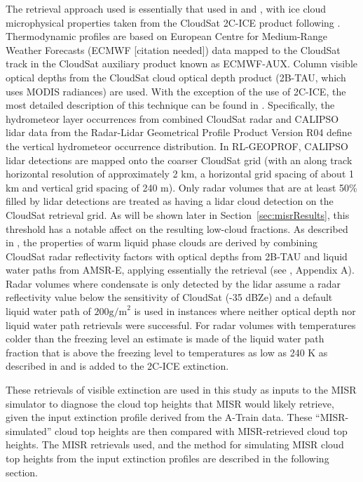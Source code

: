 The retrieval approach used is essentially that used in
\citet{mace_and_wrenn_2013} and \citet{berry_and_mace_2014}, with ice
cloud microphysical properties taken from the CloudSat 2C-ICE product
\citep{deng_et_al_2010, deng_et_al_2013} following
\citet{berry_and_mace_2014}. Thermodynamic profiles are based on
European Centre for Medium-Range Weather Forecasts (ECMWF {[}citation
needed{]}) data mapped to the CloudSat track in the CloudSat auxiliary
product known as ECMWF-AUX. Column visible optical depths from the
CloudSat cloud optical depth product (2B-TAU, which uses MODIS
radiances) are used. With the exception of the use of 2C-ICE, the most
detailed description of this technique can be found in
\citet{mace_2010}. Specifically, the hydrometeor layer occurrences from
combined CloudSat radar and CALIPSO lidar data from the Radar-Lidar
Geometrical Profile Product
\citep[RL-GEOPROF;][]{mace_et_al_2009, mace_and_zhang_2014} Version R04
define the vertical hydrometeor occurrence distribution. In RL-GEOPROF,
CALIPSO lidar detections are mapped onto the coarser CloudSat grid (with
an along track horizontal resolution of approximately 2 km, a horizontal
grid spacing of about 1 km and vertical grid spacing of 240 m). Only
radar volumes that are at least 50\% filled by lidar detections are
treated as having a lidar cloud detection on the CloudSat retrieval
grid. As will be shown later in Section~\ref{sec:misrResults}, this
threshold has a notable affect on the resulting low-cloud fractions. As
described in \citet{mace_2010}, the properties of warm liquid phase
clouds are derived by combining CloudSat radar reflectivity factors with
optical depths from 2B-TAU and liquid water paths from AMSR-E, applying
essentially the \citet{dong_and_mace_2003} retrieval (see
\citet{mace_2010}, Appendix A). Radar volumes where condensate is only
detected by the lidar assume a radar reflectivity value below the
sensitivity of CloudSat (-35 dBZe) and a default liquid water path of
\(200 \textrm{g/m}^2\) is used in instances where neither optical depth
nor liquid water path retrievals were successful. For radar volumes with
temperatures colder than the freezing level an estimate is made of the
liquid water path fraction that is above the freezing level to
temperatures as low as 240 K as described in \citet{mace_et_al_2006} and
is added to the 2C-ICE extinction.

These retrievals of visible extinction are used in this study as inputs
to the MISR simulator to diagnose the cloud top heights that MISR would
likely retrieve, given the input extinction profile derived from the
A-Train data. These ``MISR-simulated'' cloud top heights are then
compared with MISR-retrieved cloud top heights. The MISR retrievals
used, and the method for simulating MISR cloud top heights from the
input extinction profiles are described in the following section.

